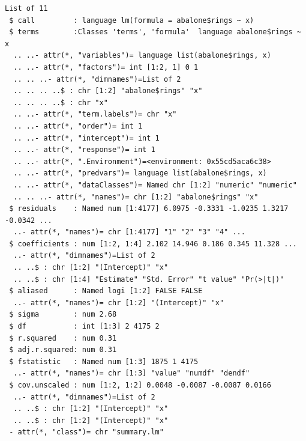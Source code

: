 \documentclass[
  11pt,
]{krantz}
\newenvironment{Shaded}{\begin{snugshade}}{\end{snugshade}}
\newcommand{\CommentTok}[1]{\textcolor[rgb]{0.37,0.37,0.37}{\textit{#1}}}
\newcommand{\ControlFlowTok}[1]{\textcolor[rgb]{0.27,0.27,0.27}{\textbf{#1}}}
\newcommand{\DecValTok}[1]{\textcolor[rgb]{0.06,0.06,0.06}{#1}}
\newcommand{\DocumentationTok}[1]{\textcolor[rgb]{0.37,0.37,0.37}{\textbf{\textit{#1}}}}
\newcommand{\FunctionTok}[1]{\textcolor[rgb]{0,0,0}{#1}}
\newcommand{\NormalTok}[1]{#1}
\newcommand{\OtherTok}[1]{\textcolor[rgb]{0.37,0.37,0.37}{#1}}
\newcommand{\SpecialCharTok}[1]{\textcolor[rgb]{0,0,0}{#1}}
\begin{document}
\begin{Shaded}
\end{Shaded}

\begin{verbatim}
List of 11
 $ call         : language lm(formula = abalone$rings ~ x)
 $ terms        :Classes 'terms', 'formula'  language abalone$rings ~ x
  .. ..- attr(*, "variables")= language list(abalone$rings, x)
  .. ..- attr(*, "factors")= int [1:2, 1] 0 1
  .. .. ..- attr(*, "dimnames")=List of 2
  .. .. .. ..$ : chr [1:2] "abalone$rings" "x"
  .. .. .. ..$ : chr "x"
  .. ..- attr(*, "term.labels")= chr "x"
  .. ..- attr(*, "order")= int 1
  .. ..- attr(*, "intercept")= int 1
  .. ..- attr(*, "response")= int 1
  .. ..- attr(*, ".Environment")=<environment: 0x55cd5aca6c38> 
  .. ..- attr(*, "predvars")= language list(abalone$rings, x)
  .. ..- attr(*, "dataClasses")= Named chr [1:2] "numeric" "numeric"
  .. .. ..- attr(*, "names")= chr [1:2] "abalone$rings" "x"
 $ residuals    : Named num [1:4177] 6.0975 -0.3331 -1.0235 1.3217 -0.0342 ...
  ..- attr(*, "names")= chr [1:4177] "1" "2" "3" "4" ...
 $ coefficients : num [1:2, 1:4] 2.102 14.946 0.186 0.345 11.328 ...
  ..- attr(*, "dimnames")=List of 2
  .. ..$ : chr [1:2] "(Intercept)" "x"
  .. ..$ : chr [1:4] "Estimate" "Std. Error" "t value" "Pr(>|t|)"
 $ aliased      : Named logi [1:2] FALSE FALSE
  ..- attr(*, "names")= chr [1:2] "(Intercept)" "x"
 $ sigma        : num 2.68
 $ df           : int [1:3] 2 4175 2
 $ r.squared    : num 0.31
 $ adj.r.squared: num 0.31
 $ fstatistic   : Named num [1:3] 1875 1 4175
  ..- attr(*, "names")= chr [1:3] "value" "numdf" "dendf"
 $ cov.unscaled : num [1:2, 1:2] 0.0048 -0.0087 -0.0087 0.0166
  ..- attr(*, "dimnames")=List of 2
  .. ..$ : chr [1:2] "(Intercept)" "x"
  .. ..$ : chr [1:2] "(Intercept)" "x"
 - attr(*, "class")= chr "summary.lm"
\end{verbatim}
\end{document}
